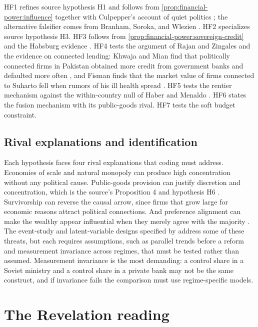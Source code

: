 \documentclass[11pt,letterpaper]{article}
\theoremstyle{definition}
\theoremstyle{remark}
\begin{document}
HF1 refines source hypothesis H1 and follows from \cref{prop:financial-power:influence} together with Culpepper's account of quiet politics \citep{culpepper2010}; the alternative falsifier comes from Branham, Soroka, and Wlezien \citep{branham2017}. HF2 specializes source hypothesis H3. HF3 follows from \cref{prop:financial-power:sovereign-credit} and the Habsburg evidence \citep{drelichman2011}. HF4 tests the argument of Rajan and Zingales \citep{rajan2003} and the evidence on connected lending: Khwaja and Mian find that politically connected firms in Pakistan obtained more credit from government banks and defaulted more often \citep{khwaja2005}, and Fisman finds that the market value of firms connected to Suharto fell when rumors of his ill health spread \citep{fisman2001}. HF5 tests the rentier mechanism against the within-country null of Haber and Menaldo \citep{habermenaldo2011}. HF6 states the fusion mechanism with its public-goods rival. HF7 tests the soft budget constraint.

\subsection{Rival explanations and identification}

Each hypothesis faces four rival explanations that coding must address. Economies of scale and natural monopoly can produce high concentration without any political cause. Public-goods provision can justify discretion and concentration, which is the source's Proposition 4 and hypothesis H6 \citep{largo2026hbs}. Survivorship can reverse the causal arrow, since firms that grow large for economic reasons attract political connections. And preference alignment can make the wealthy appear influential when they merely agree with the majority \citep{branham2017}. The event-study and latent-variable designs specified by \citet{largo2026hbs} address some of these threats, but each requires assumptions, such as parallel trends before a reform and measurement invariance across regimes, that must be tested rather than assumed. Measurement invariance is the most demanding: a control share in a Soviet ministry and a control share in a private bank may not be the same construct, and if invariance fails the comparison must use regime-specific models.

\section{The Revelation reading}
\label{sec:revelation}
\end{document}
